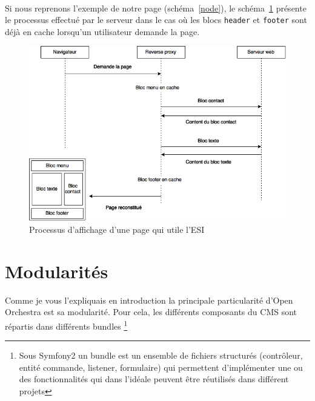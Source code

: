    \paragraph{}
   Si nous reprenons l'exemple de notre page (schéma~\ref{node}), le schéma~\ref{esi} présente le processus effectué par le serveur dans le cas où les blocs \verb?header? et \verb?footer? sont déjà en cache lorsqu'un utilisateur demande la page.
   		\begin{figure}[H]
        \begin{center}
          \includegraphics[scale=0.75]{images/esi}
        \end{center}
        \caption{Processus d'affichage d'une page qui utile l'ESI}
        \label{esi}
      \end{figure}
   
   \section{Modularités}
   Comme je vous l'expliquais en introduction la principale particularité d'Open Orchestra est sa modularité. Pour cela, les différents composants du CMS sont répartis dans différents bundles \footnote{Sous Symfony2 un bundle est un ensemble de fichiers structurés (contrôleur, entité commande, listener, formulaire) qui permettent d'implémenter une ou des fonctionnalités qui dans l'idéale peuvent être réutilisés dans différent projets}
